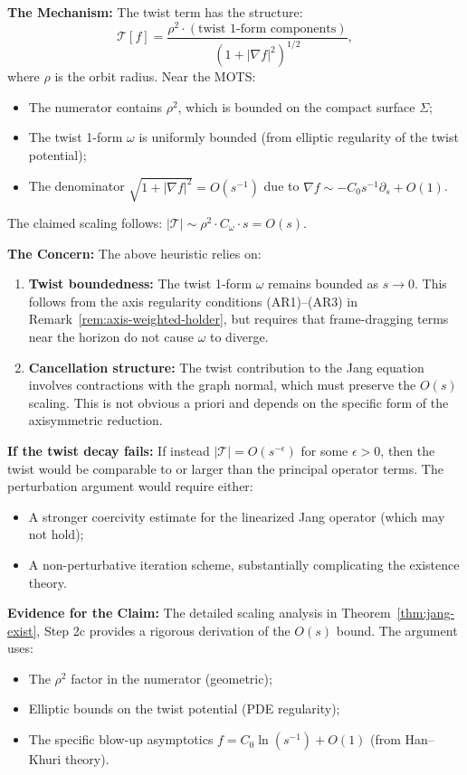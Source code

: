 \textbf{The Mechanism:} The twist term has the structure:
\[
\mathcal{T}[f] = \frac{\rho^2 \cdot (\text{twist 1-form components})}{(1 + |\nabla f|^2)^{1/2}},
\]
where $\rho$ is the orbit radius. Near the MOTS:
\begin{itemize}[leftmargin=1.5em]
\item The numerator contains $\rho^2$, which is bounded on the compact surface $\Sigma$;
\item The twist 1-form $\omega$ is uniformly bounded (from elliptic regularity of the twist potential);
\item The denominator $\sqrt{1 + |\nabla f|^2} = O(s^{-1})$ due to $\nabla f \sim -C_0 s^{-1} \partial_s + O(1)$.
\end{itemize}
The claimed scaling follows: $|\mathcal{T}| \sim \rho^2 \cdot C_\omega \cdot s = O(s)$.

\textbf{The Concern:} The above heuristic relies on:
\begin{enumerate}[label=(\alph*)]
\item \textbf{Twist boundedness:} The twist 1-form $\omega$ remains bounded as $s \to 0$. This follows from the axis regularity conditions (AR1)--(AR3) in Remark~\ref{rem:axis-weighted-holder}, but requires that frame-dragging terms near the horizon do not cause $\omega$ to diverge.
\item \textbf{Cancellation structure:} The twist contribution to the Jang equation involves contractions with the graph normal, which must preserve the $O(s)$ scaling. This is not obvious a priori and depends on the specific form of the axisymmetric reduction.
\end{enumerate}

\textbf{If the twist decay fails:} If instead $|\mathcal{T}| = O(s^{-\epsilon})$ for some $\epsilon > 0$, then the twist would be comparable to or larger than the principal operator terms. The perturbation argument would require either:
\begin{itemize}
\item A stronger coercivity estimate for the linearized Jang operator (which may not hold);
\item A non-perturbative iteration scheme, substantially complicating the existence theory.
\end{itemize}

\textbf{Evidence for the Claim:} The detailed scaling analysis in Theorem~\ref{thm:jang-exist}, Step 2c provides a rigorous derivation of the $O(s)$ bound. The argument uses:
\begin{itemize}
\item The $\rho^2$ factor in the numerator (geometric);
\item Elliptic bounds on the twist potential (PDE regularity);
\item The specific blow-up asymptotics $f = C_0\ln(s^{-1}) + O(1)$ (from Han--Khuri theory).
\end{itemize}

